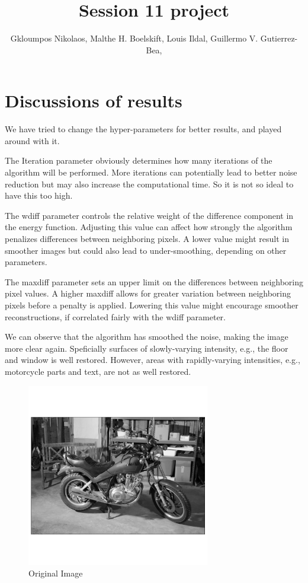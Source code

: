 \documentclass{article}
\title{Session 11 project}
\author {
      Gkloumpos Nikolaos,
      Malthe H. Boelskift,
      Louis Ildal,
      Guillermo V. Gutierrez-Bea,
}
\begin{document}
\maketitle


\section{Discussions of results} 

We have tried to change the hyper-parameters for better results, and played around with it. 

The Iteration parameter obviously determines how many iterations of the algorithm will be performed. 
More iterations can potentially lead to better noise reduction but may also increase the computational time.
So it is not so ideal to have this too high.

The wdiff parameter  controls the relative weight of the difference component in the energy function. 
Adjusting this value can affect how strongly the algorithm penalizes differences between neighboring pixels. 
A lower value might result in smoother images but could also lead to under-smoothing, depending on other parameters.

The maxdiff parameter sets an upper limit on the differences between neighboring pixel values. 
A higher maxdiff allows for greater variation between neighboring pixels before a penalty is applied. 
Lowering this value might encourage smoother reconstructions, if correlated fairly with the wdiff parameter.

We can observe that the algorithm has smoothed the noise, making the image more clear again. 
Speficially surfaces of slowly-varying intensity, e.g., the floor and window is well restored. 
However, areas with rapidly-varying intensities, e.g., motorcycle parts and text, are not as well restored.

\begin{figure}[H]
      \includegraphics[width=8cm]{assets/Original.png}
      \centering
      \caption{Original Image}
\end{figure}
\end{document}
